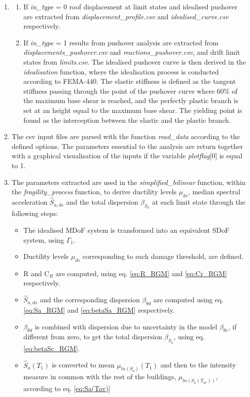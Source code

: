 \begin{enumerate}
\item
\begin{enumerate}
\item If \textit{in\_type} = 0 roof displacement at limit states and idealised pushover are extracted from \textit{displacement\_profile.csv} and \textit{idealised\_curve.csv} respectively.
\item If \textit{in\_type} = 1 results from pushover analysis are extracted from \textit{displacements\_pushover.csv} and \textit{reactions\_pushover.csv}, and drift limit states from \textit{limits.csv}. The idealised 	pushover curve is then derived in the \textit{idealisation} function, where the idealisation process is conducted according to FEMA-440. The elastic stiffness is defined as the 	tangent stiffness passing through the point of the pushover curve where 60\% of the maximum base shear is reached, and the perfectly plastic branch is set at an height equal to 	the maximum base shear. The yielding point is found as the interception between the elastic and the plastic branch.
\end{enumerate}

\item The csv input files are parsed with the function \textit{read\_data} according to the defined options. The parameters essential to the analysis are return together with a graphical visualisation of the inputs if the variable \textit{plotflag}[0] is equal to 1.

\item The parameters extracted are used in the \textit{simplified\_bilinear} function, within the \textit{fragility\_process} function, to derive ductility levels $\mu_{ds}$, median spectral acceleration $\hat{S}_{a,ds}$ and the total dispersion $\beta_{S_a}$ at each limit state through the following steps:
\begin{itemize}
\item The idealised MDoF system is transformed into an equivalent SDoF system, using $\Gamma_1$.
\item Ductility levels $\mu_{ds}$ corresponding to each damage threshold, are defined.
\item R and C$_R$ are computed, using eq. \ref{eq:R_RGM} and \ref{eq:Cr_RGM} respectively.
\item $\hat{S}_{a,ds}$ and the corresponding dispersion  $\beta_{\theta d}$ are computed using eq. \ref{eq:Sa_RGM} and \ref{eq:betaSa_RGM} respectively.
\item $\beta_{\theta d}$ is combined with dispersion due to uncertainty in the model $\beta_{\theta c}$, if different from zero, to get the total dispersion $\beta_{S_a}$, using eq. \ref{eq:betaSc_RGM}.
\item $\hat{S}_a(T_1)$ is converted to mean $\mu_{ln(S_a)}(T_1)$ and then to the intensity measure in common with the rest of the buildings, $\mu_{ln(S_a(T_{av}))}$, according to eq. \ref{eq:Sa(Tav)}
\end{itemize}


\end{enumerate}
